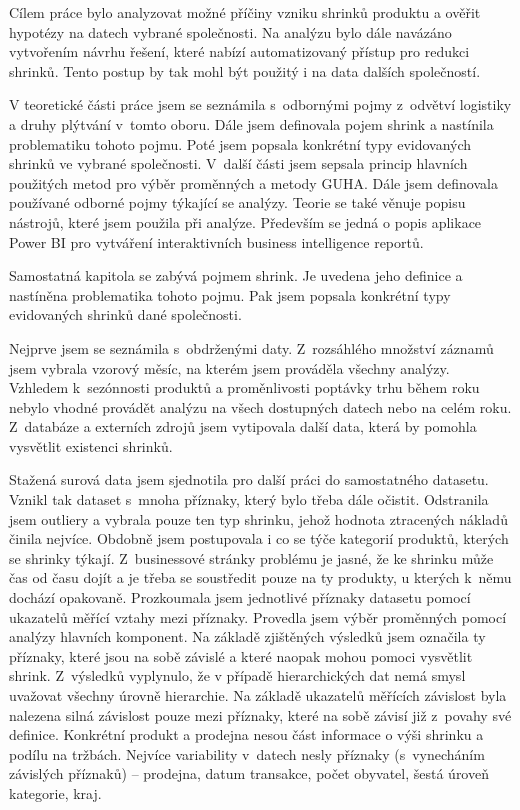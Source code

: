 Cílem práce bylo analyzovat možné příčiny vzniku shrinků produktu a ověřit hypotézy na datech vybrané společnosti. Na analýzu bylo dále navázáno vytvořením návrhu řešení, které nabízí automatizovaný přístup pro redukci shrinků. Tento postup by tak mohl být použitý i na data dalších společností.

V teoretické části práce jsem se seznámila s~odbornými pojmy z~odvětví logistiky a druhy plýtvání v~tomto oboru. Dále jsem definovala pojem shrink a nastínila problematiku tohoto pojmu. Poté jsem popsala konkrétní typy evidovaných shrinků ve vybrané společnosti. V~další části jsem sepsala princip hlavních použitých metod pro výběr proměnných a metody GUHA. Dále jsem definovala používané odborné pojmy týkající se analýzy. Teorie se také věnuje popisu nástrojů, které jsem použila při analýze. Především se jedná o popis aplikace Power BI pro vytváření interaktivních business intelligence reportů.

Samostatná kapitola se zabývá pojmem shrink. Je uvedena jeho definice a nastíněna problematika tohoto pojmu. Pak jsem popsala konkrétní typy evidovaných shrinků dané společnosti.

Nejprve jsem se seznámila s~obdrženými daty. Z~rozsáhlého množství záznamů jsem vybrala vzorový měsíc, na kterém jsem prováděla všechny analýzy. Vzhledem k~sezónnosti produktů a proměnlivosti poptávky trhu během roku nebylo vhodné provádět analýzu na všech dostupných datech nebo na celém roku. Z~databáze a externích zdrojů jsem vytipovala další data, která by pomohla vysvětlit existenci shrinků.

Stažená surová data jsem sjednotila pro další práci do samostatného datasetu. Vznikl tak dataset s~mnoha příznaky, který bylo třeba dále očistit. Odstranila jsem outliery a vybrala pouze ten typ shrinku, jehož hodnota ztracených nákladů činila nejvíce. Obdobně jsem postupovala i co se týče kategorií produktů, kterých se shrinky týkají. Z~businessové stránky problému je jasné, že ke shrinku může čas od času dojít a je třeba se soustředit pouze na ty produkty, u kterých k~němu dochází opakovaně. 
Prozkoumala jsem jednotlivé příznaky datasetu pomocí ukazatelů měřící vztahy mezi příznaky. Provedla jsem výběr proměnných pomocí analýzy hlavních komponent. Na základě zjištěných výsledků jsem označila ty příznaky, které jsou na sobě závislé a které naopak mohou pomoci vysvětlit shrink. Z~výsledků vyplynulo, že v případě hierarchických dat nemá smysl uvažovat všechny úrovně hierarchie. Na základě ukazatelů měřících závislost byla nalezena silná závislost pouze mezi příznaky, které na sobě závisí již z~povahy své definice. Konkrétní produkt a prodejna nesou část informace o výši shrinku a podílu na tržbách. Nejvíce variability v~datech nesly příznaky (s~vynecháním závislých příznaků) -- prodejna, datum transakce, počet obyvatel, šestá úroveň kategorie, kraj.

